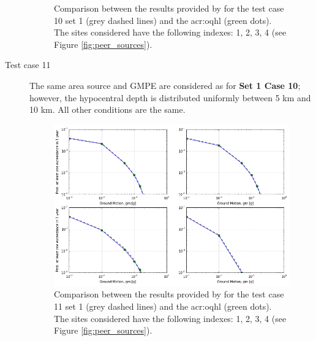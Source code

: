 \begin{description}
\begin{figure}[!ht]
\caption{Comparison between the results provided by \textcite{thomas2010}
for the test case 10 set 1 (grey dashed lines) and the \gls{acr:oqhl} 
(green dots). The sites considered have the following indexes: 
1, 2, 3, 4 (see Figure \ref{fig:peer_sources}).}
\label{fig:peer_set1_test10}
\end{figure}
    \clearpage
    \item [Test case 11]
        The same area source and GMPE are considered as for 
        \textbf{Set 1 Case 10}; 
        however, the hypocentral depth is distributed uniformly between 5 km 
        and 10 km. All other conditions are the same.
\begin{figure}[!ht]
\centering
\includegraphics[width=14cm]{./Pictures/qa/test11_set1.png}
\caption{Comparison between the results provided by \textcite{thomas2010}
for the test case 11 set 1 (grey dashed lines) and the \gls{acr:oqhl} 
(green dots). The sites considered have the following indexes: 
1, 2, 3, 4 (see Figure \ref{fig:peer_sources}).}
\label{fig:peer_set1_test11}
\end{figure}
\end{description}
